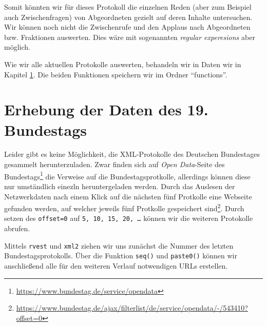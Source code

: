 \documentclass[oneside, 12pt, numbers=endperiod]{scrbook}
\newenvironment{Shaded}{\begin{snugshade}}{\end{snugshade}}
\newcommand{\CharTok}[1]{\textcolor[rgb]{0.31,0.60,0.02}{#1}}
\newcommand{\DataTypeTok}[1]{\textcolor[rgb]{0.13,0.29,0.53}{#1}}
\newcommand{\DecValTok}[1]{\textcolor[rgb]{0.00,0.00,0.81}{#1}}
\newcommand{\KeywordTok}[1]{\textcolor[rgb]{0.13,0.29,0.53}{\textbf{#1}}}
\newcommand{\NormalTok}[1]{#1}
\newcommand{\OperatorTok}[1]{\textcolor[rgb]{0.81,0.36,0.00}{\textbf{#1}}}
\newcommand{\OtherTok}[1]{\textcolor[rgb]{0.56,0.35,0.01}{#1}}
\newcommand{\StringTok}[1]{\textcolor[rgb]{0.31,0.60,0.02}{#1}}
\theoremstyle{definition}
\theoremstyle{definition}
\theoremstyle{definition}
\theoremstyle{remark}
\begin{document}
Somit könnten wir für dieses Protokoll die einzelnen Reden (aber zum
Beispiel auch Zwischenfragen) von Abgeordneten gezielt auf deren Inhalte
untersuchen. Wir können noch nicht die Zwischenrufe und den Applaus nach
Abgeordneten bzw. Fraktionen auswerten. Dies wäre mit sogenannten
\emph{regular experesions} aber möglich.

Wie wir alle aktuellen Protokolle auswerten, behandeln wir in Daten wir
in Kapitel \ref{data-02}. Die beiden Funktionen speichern wir im Ordner
``functions''.

\hypertarget{data-02}{%
\chapter{Erhebung der Daten des 19. Bundestags}\label{data-02}}

Leider gibt es keine Möglichkeit, die XML-Protokolle des Deutschen
Bundestages gesammelt herunterzuladen. Zwar finden sich auf \emph{Open
Data}-Seite des Bundestags\footnote{\url{https://www.bundestag.de/service/opendata}}
die Verweise auf die Bundestagsprotkolle, allerdings können diese nur
umständlich einezln heruntergeladen werden. Durch das Auslesen der
Netzwerkdaten nach einem Klick auf die nächsten fünf Protkolle eine
Webseite gefunden werden, auf welcher jeweils fünf Protkolle gespeichert
sind\footnote{\url{https://www.bundestag.de/ajax/filterlist/de/service/opendata/-/543410?offset=0}}.
Durch setzen des \texttt{offset=0} auf
\texttt{5,\ 10,\ 15,\ 20,\ \ldots{}} können wir die weiteren Protokolle
abrufen.

Mittels \texttt{rvest} und \texttt{xml2} ziehen wir uns zunächst die
Nummer des letzten Bundestagsprotokolls. Über die Funktion
\texttt{seq()} und \texttt{paste0()} können wir anschließend alle für
den weiteren Verlauf notwendigen URLs erstellen.

\begin{Shaded}
\end{Shaded}
\end{document}
